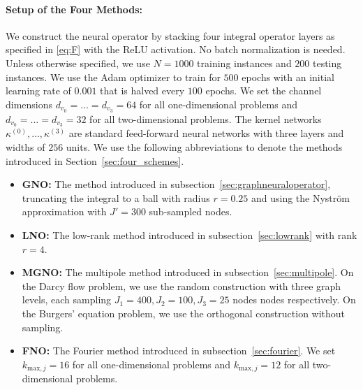 \documentclass[twoside,11pt]{article}
\begin{document}
\paragraph{Setup of the Four Methods:}
We construct the neural operator by stacking four integral operator layers as specified in \eqref{eq:F} with the ReLU activation. No batch normalization is needed. Unless otherwise specified, we use $N=1000$ training instances and $200$ testing instances. We use the
Adam optimizer to train for $500$ epochs with an initial learning rate of $0.001$ that is halved every $100$ epochs. We set the channel dimensions $d_{v_0} = \dots = d_{v_3} = 64$ for all one-dimensional problems and $d_{v_0} = \dots = d_{v_3} = 32$ for all two-dimensional problems. The kernel networks $\kappa^{(0)},\dots,\kappa^{(3)}$ are standard feed-forward neural networks with three layers and widths of $256$ units. We use the following abbreviations to denote the methods introduced in Section~\ref{sec:four_schemes}.
\begin{itemize}
    \item {\bf GNO:} The method introduced in subsection~\ref{sec:graphneuraloperator}, truncating the integral to a ball with radius \(r=0.25\) and using the Nystr\"om approximation with \(J' = 300\) sub-sampled nodes.
    \item {\bf LNO:} The low-rank method introduced in subsection~\ref{sec:lowrank} with rank $r=4$.
    \item {\bf MGNO:} The multipole method introduced in subsection~\ref{sec:multipole}. On  the Darcy flow problem, we use the random construction with three graph levels, each sampling $J_1 = 400, J_2 = 100, J_3 =25$ nodes nodes respectively. On the Burgers' equation problem, we use the orthogonal construction without sampling.
    \item {\bf FNO:} The Fourier method introduced in subsection~\ref{sec:fourier}. We set $k_{\text{max},j} = 16$ for all one-dimensional problems and $k_{\text{max},j} = 12$ for all two-dimensional problems.
\end{itemize}
\end{document}
